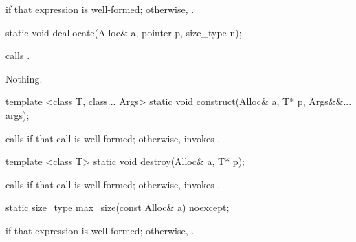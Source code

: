 \begin{itemdescr}
\pnum
\returns {} if that expression is well-formed; otherwise, .
\end{itemdescr}

%
%
\begin{itemdecl}
static void deallocate(Alloc& a, pointer p, size_type n);
\end{itemdecl}

\begin{itemdescr}
\pnum
\effects calls .

\pnum
\throws Nothing.
\end{itemdescr}

%
\begin{itemdecl}
template <class T, class... Args>
  static void construct(Alloc& a, T* p, Args&&... args);
\end{itemdecl}

\begin{itemdescr}
\pnum
\effects calls 
if that call is well-formed;
otherwise, invokes .
\end{itemdescr}

%
\begin{itemdecl}
template <class T>
  static void destroy(Alloc& a, T* p);
\end{itemdecl}

\begin{itemdescr}
\pnum
\effects calls  if that call is well-formed; otherwise, invokes
.
\end{itemdescr}

%
%
\begin{itemdecl}
static size_type max_size(const Alloc& a) noexcept;
\end{itemdecl}

\begin{itemdescr}
\pnum
\returns {} if that expression is well-formed; otherwise,
.
\end{itemdescr}

